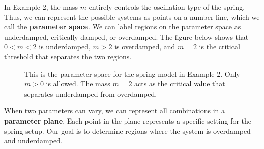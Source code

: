 \documentclass[10pt,letterpaper]{article}
\begin{document}
In Example 2, the mass $m$ entirely controls the oscillation type of the spring. Thus, we can represent the possible systems as points on a number line, which we call the \textbf{parameter space}. We can label regions on the parameter space as underdamped, critically damped, or overdamped. The figure below shows that $0<m<2$ is underdamped, $m>2$ is overdamped, and $m=2$ is the critical threshold that separates the two regions.

\begin{figure}[H]
\centering
{}
\caption{This is the parameter space for the spring model in Example 2. Only $m>0$ is allowed. The mass $m=2$ acts as the critical value that separates underdamped from overdamped.}
\end{figure}

When two parameters can vary, we can represent all combinations in a \textbf{parameter plane}. Each point in the plane represents a specific setting for the spring setup. Our goal is to determine regions where the system is overdamped and underdamped.
\end{document}
